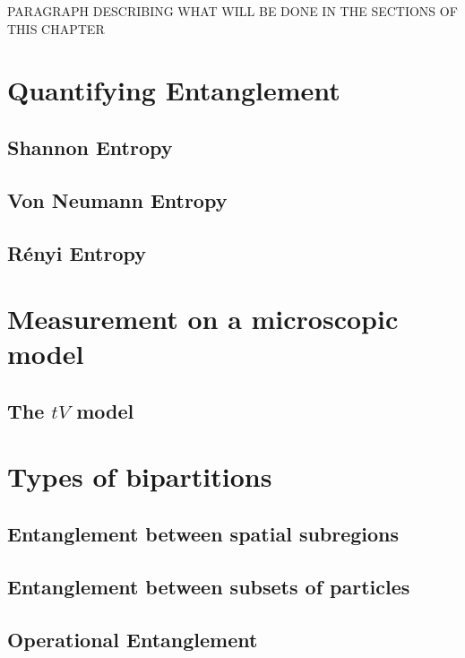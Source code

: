 PARAGRAPH DESCRIBING WHAT WILL BE DONE IN THE SECTIONS OF THIS CHAPTER


\section{Quantifying Entanglement} 
	\subsection{Shannon Entropy}
	\subsection{Von Neumann Entropy}
	\subsection{R\'enyi Entropy}


\section{Measurement on a microscopic model} 
	\subsection{The $tV$ model}
	
\section{Types of bipartitions}
	\subsection{Entanglement between spatial subregions}
	\subsection{Entanglement between subsets of particles}
	\subsection{Operational Entanglement}
	
